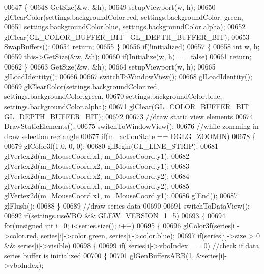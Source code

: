\begin{DoxyCode}
{{{{{{{{00647     \{
00648         GetSize(&w, &h);
00649         setupViewport(w, h);
00650         glClearColor(settings.backgroundColor.red, settings.backgroundColor.
      green,
00651                 settings.backgroundColor.blue, settings.backgroundColor.alpha);
00652         glClear(GL_COLOR_BUFFER_BIT | GL_DEPTH_BUFFER_BIT);
00653         SwapBuffers();
00654         \textcolor{keywordflow}{return};
00655     \}
00656     \textcolor{keywordflow}{if}(!initialized)
00657     \{
00658         \textcolor{keywordtype}{int} w, h;
00659         this->GetSize(&w, &h);
00660         \textcolor{keywordflow}{if}(Initialize(w, h) == \textcolor{keyword}{false})
00661             \textcolor{keywordflow}{return};
00662     \}
00663     GetSize(&w, &h);
00664     setupViewport(w, h);
00665     glLoadIdentity();
00666 
00667     switchToWindowView();
00668     glLoadIdentity();
00669     glClearColor(settings.backgroundColor.red, settings.backgroundColor.green,
00670                 settings.backgroundColor.blue, settings.backgroundColor.alpha);
00671     glClear(GL_COLOR_BUFFER_BIT | GL_DEPTH_BUFFER_BIT);
00672 
00673     \textcolor{comment}{//draw static view elements}
00674     DrawStaticElements();
00675     switchToWindowView();
00676     \textcolor{comment}{//while zomming in draw selection rectangle}
00677     \textcolor{keywordflow}{if}(m_actionState == OGLG_ZOOMIN)
00678     \{
00679         glColor3f(1.0, 0, 0);
00680         glBegin(GL_LINE_STRIP);
00681             glVertex2d(m_MouseCoord.x1, m_MouseCoord.y1);
00682             glVertex2d(m_MouseCoord.x2, m_MouseCoord.y1);
00683             glVertex2d(m_MouseCoord.x2, m_MouseCoord.y2);
00684             glVertex2d(m_MouseCoord.x1, m_MouseCoord.y2);
00685             glVertex2d(m_MouseCoord.x1, m_MouseCoord.y1);
00686         glEnd();
00687         glFlush();
00688     \}
00689     \textcolor{comment}{//draw series data}
00690 
00691     switchToDataView();
00692     \textcolor{keywordflow}{if}(settings.useVBO && GLEW_VERSION_1_5)
00693     \{
00694         \textcolor{keywordflow}{for}(\textcolor{keywordtype}{unsigned} \textcolor{keywordtype}{int} i=0; i<series.size(); i++)
00695         \{
00696             glColor3f(series[i]->color.red, series[i]->color.green, series[i]->color.blue);
00697             \textcolor{keywordflow}{if}(series[i]->size > 0 && series[i]->visible)
00698             \{
00699                 \textcolor{keywordflow}{if}( series[i]->vboIndex == 0) \textcolor{comment}{//check if data series buffer is initialized}
00700                 \{
00701                     glGenBuffersARB(1, &series[i]->vboIndex);
}}}}}}}}
\end{DoxyCode}
